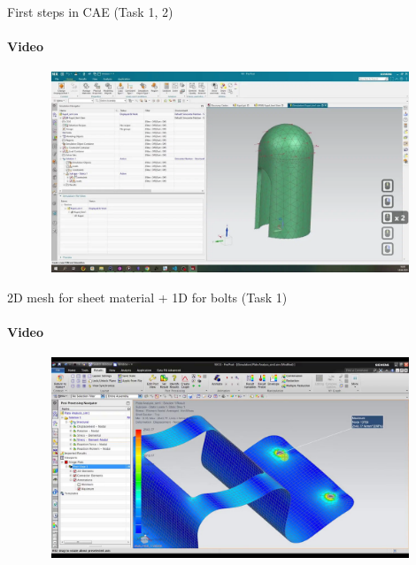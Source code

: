 \documentclass[aspectratio=169]{beamer}
\begin{document}
\begin{frame}[t]{First steps in CAE (Task 1, 2)}
    \framesubtitle{Video}
    \vspace{-0.6cm}
    \begin{figure}[H]
        \href{https://disk.yandex.ru/i/zj26vr7Uk03ilA}{
            \centering\includegraphics[height=6cm,width=1\textwidth,keepaspectratio]{basics_cae_video.png}}
        \label{fig:basics_cae_video.png}
    \end{figure}
\end{frame}

\begin{frame}[t]{2D mesh for sheet material + 1D for bolts (Task 1)}
    \framesubtitle{Video}
    \vspace{-0.6cm}
    \begin{figure}[H]
        \href{https://www.youtube.com/watch?v=3hZTIqXxq1o}{
            \centering\includegraphics[height=6cm,width=1\textwidth,keepaspectratio]{two_d_sheet_video.jpg}}
        \label{fig:two_d_sheet_video.jpg}
    \end{figure}
\end{frame}
\end{document}
